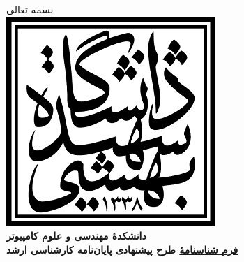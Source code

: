 \documentclass[letterpaper,11pt]{article}
\begin{document}
\begin{center}
\footnotesize{بسمه تعالی} \\ \vspace{20pt}
\includegraphics[scale=0.4]{assets/logo.png} \\
\footnotesize{\textbf{دانشکدهٔ مهندسی و علوم کامپیوتر}}\\ \vspace{10pt}
{\LARGE \textbf{\underline{فرم شناسنامهٔ} طرح پیشنهادی پایان‌نامه کارشناسی ارشد}} \\
\end{center}
\end{document}
